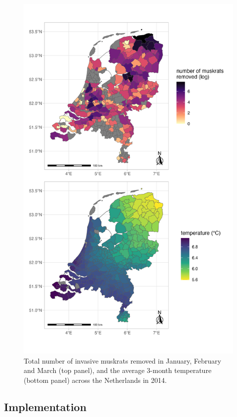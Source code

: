 \documentclass[
  11pt,
  a4paper,
]{article}
\begin{document}
\begin{figure}[H]

{\centering \includegraphics[width=0.7\linewidth]{dat_muskrats} 

}

\caption{Total number of invasive muskrats removed in January, February and March (top panel), and the average 3-month temperature (bottom panel) across the Netherlands in 2014.}\label{fig:datsmuskrats}
\end{figure}

\subsection{Implementation}\label{implementation}
\end{document}
